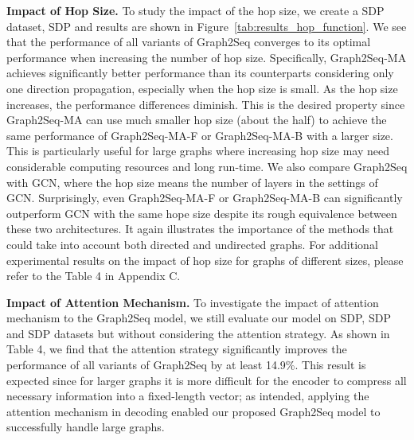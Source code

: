 \documentclass{article} \usepackage{iclr2019_conference,times}
\begin{document}
\textbf{Impact of Hop Size.} To study the impact of the hop size, we create a SDP dataset, SDP and results are shown in 
Figure~\ref{tab:results_hop_function}. We see that the performance of all variants of Graph2Seq converges to its optimal performance when increasing the number of hop size. Specifically, Graph2Seq-MA achieves significantly better performance than its counterparts considering only one direction propagation, especially when the hop size is small. As the hop size increases, the performance differences diminish. This is the desired property since Graph2Seq-MA can use much smaller hop size (about the half) to achieve the same performance of Graph2Seq-MA-F or Graph2Seq-MA-B with a larger size. This is particularly useful for large graphs where increasing hop size may need considerable computing resources and long run-time. We also compare Graph2Seq with GCN, where the hop size means the number of layers in the settings of GCN. Surprisingly, even Graph2Seq-MA-F or Graph2Seq-MA-B can significantly outperform GCN with the same hope size despite its rough equivalence between these two architectures. It again illustrates the importance of the methods that could take into account both directed and undirected graphs. For additional experimental results on the impact of hop size for graphs of different sizes, please refer to the Table 4 in Appendix C. 

\textbf{Impact of Attention Mechanism.}
To investigate the impact of attention mechanism to the Graph2Seq model, we still evaluate our model on SDP, SDP and SDP datasets but without considering the attention strategy. 
As shown in Table 4, we find that the attention strategy significantly improves the performance of all variants of Graph2Seq by at least 14.9\%. This result is expected since for larger graphs it is more difficult for the encoder to compress all necessary information into a fixed-length vector; as intended, applying the attention mechanism in decoding enabled our proposed Graph2Seq model to successfully handle large graphs.




\vspace{-0.1cm}
\end{document}
